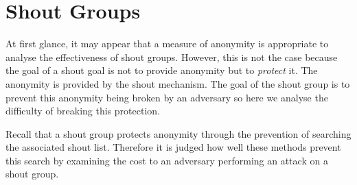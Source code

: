 \documentclass[ %
                    author={Luke Murray},
                supervisor={Dr. Simon Hollis},
                     title={Shadow Peer-to-Peer Networks},
                  subtitle={},
                    degree={MEng},
                      year={2013} ]{thesis}
\begin{document}
\section{Shout Groups}

At first glance, it may appear that a measure of anonymity is appropriate to analyse the effectiveness of shout groups. However, this is not the case because the goal of a shout goal is not to provide anonymity but to {\em protect} it. The anonymity is provided by the shout mechanism. The goal of the shout group is to prevent this anonymity being broken by an adversary so here we analyse the difficulty of breaking this protection.

Recall that a shout group protects anonymity through the prevention of searching the associated shout list. Therefore it is judged how well these methods prevent this search by examining the cost to an adversary performing an attack on a shout group.
\end{document}
